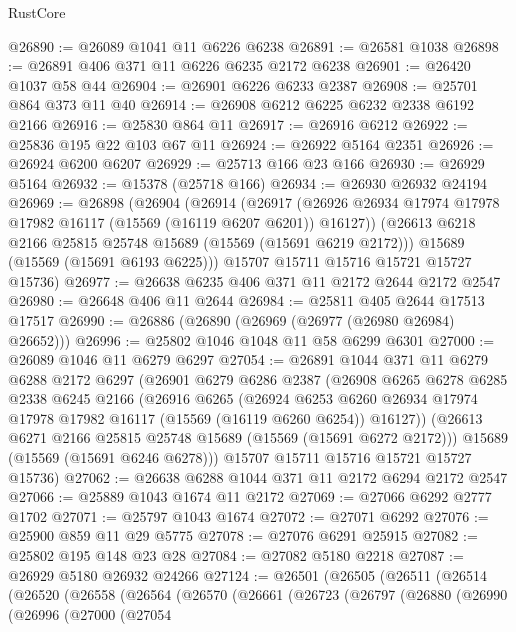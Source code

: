 \begin{lexlean}{RustCore}
\begin{coremodule}
@26890 := @26089 @1041 @11 @6226 @6238
@26891 := @26581 @1038
@26898 := @26891 @406 @371 @11 @6226 @6235 @2172 @6238
@26901 := @26420 @1037 @58 @44
@26904 := @26901 @6226 @6233 @2387
@26908 := @25701 @864 @373 @11 @40
@26914 := @26908 @6212 @6225 @6232 @2338 @6192 @2166
@26916 := @25830 @864 @11
@26917 := @26916 @6212
@26922 := @25836 @195 @22 @103 @67 @11
@26924 := @26922 @5164 @2351
@26926 := @26924 @6200 @6207
@26929 := @25713 @166 @23 @166
@26930 := @26929 @5164
@26932 := @15378 (@25718 @166)
@26934 := @26930 @26932 @24194
@26969 := @26898
    (@26904
      (@26914
        (@26917 (@26926 @26934 @17974 @17978 @17982 @16117 (@15569 (@16119 @6207 @6201)) @16127))
        (@26613 @6218 @2166 @25815 @25748 @15689 (@15569 (@15691 @6219 @2172)))
        @15689
        (@15569 (@15691 @6193 @6225)))
      @15707
      @15711
      @15716
      @15721
      @15727
      @15736)
@26977 := @26638 @6235 @406 @371 @11 @2172 @2644 @2172 @2547
@26980 := @26648 @406 @11 @2644
@26984 := @25811 @405 @2644 @17513 @17517
@26990 := @26886 (@26890 (@26969 (@26977 (@26980 @26984) @26652)))
@26996 := @25802 @1046 @1048 @11 @58 @6299 @6301
@27000 := @26089 @1046 @11 @6279 @6297
@27054 := @26891
    @1044
    @371
    @11
    @6279
    @6288
    @2172
    @6297
    (@26901
      @6279
      @6286
      @2387
      (@26908
        @6265
        @6278
        @6285
        @2338
        @6245
        @2166
        (@26916
          @6265
          (@26924
            @6253
            @6260
            @26934
            @17974
            @17978
            @17982
            @16117
            (@15569 (@16119 @6260 @6254))
            @16127))
        (@26613 @6271 @2166 @25815 @25748 @15689 (@15569 (@15691 @6272 @2172)))
        @15689
        (@15569 (@15691 @6246 @6278)))
      @15707
      @15711
      @15716
      @15721
      @15727
      @15736)
@27062 := @26638 @6288 @1044 @371 @11 @2172 @6294 @2172 @2547
@27066 := @25889 @1043 @1674 @11 @2172
@27069 := @27066 @6292 @2777 @1702
@27071 := @25797 @1043 @1674
@27072 := @27071 @6292
@27076 := @25900 @859 @11 @29 @5775
@27078 := @27076 @6291 @25915
@27082 := @25802 @195 @148 @23 @28
@27084 := @27082 @5180 @2218
@27087 := @26929 @5180 @26932 @24266
@27124 := @26501
    (@26505
      (@26511
        (@26514
          (@26520
            (@26558
              (@26564
                (@26570
                  (@26661
                    (@26723
                      (@26797
                        (@26880
                          (@26990
                            (@26996
                              (@27000
                                (@27054

\end{coremodule}
\end{lexlean}
